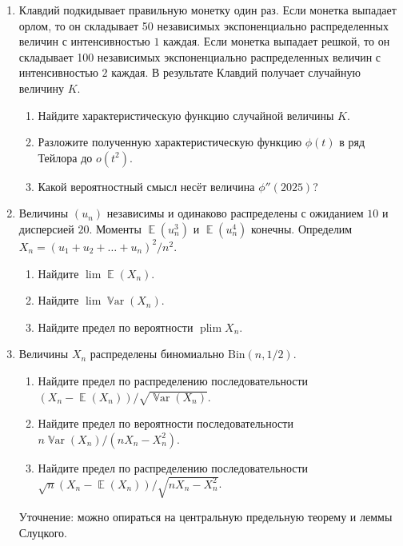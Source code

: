\documentclass[12pt]{article}
\DeclareMathOperator{\Var}{\mathbb{V}ar}
\DeclareMathOperator{\plim}{plim}
\DeclareMathOperator{\E}{\mathbb{E}}
\newcommand{\dBin}{\mathrm{Bin}}
\begin{document}
\begin{enumerate}
    \item Клавдий подкидывает правильную монетку один раз. 
    Если монетка выпадает орлом, то он складывает 50 независимых экспоненциально распределенных величин с интенсивностью $1$ каждая. 
    Если монетка выпадает решкой, то он складывает 100 независимых экспоненциально распределенных величин с интенсивностью $2$ каждая. 
    В результате Клавдий получает случайную величину $K$.

    \begin{enumerate}
        \item Найдите характеристическую функцию случайной величины $K$.
        \item Разложите полученную характеристическую функцию $\phi(t)$ в ряд Тейлора до $o(t^2)$.
        \item Какой вероятностный смысл несёт величина $\phi''(2025)$?
    \end{enumerate}

    \item Величины $(u_n)$ независимы и одинаково распределены с ожиданием $10$ и дисперсией $20$.
    Моменты $\E(u_n^3)$ и $\E(u_n^4)$ конечны.
    Определим $X_n = (u_1 + u_2 + \dots + u_n)^2 / n^2$.

    \begin{enumerate}
        \item Найдите $\lim \E(X_n)$.
        \item Найдите $\lim \Var(X_n)$.
        \item Найдите предел по вероятности $\plim X_n$.
    \end{enumerate}
    
    \item Величины $X_n$ распределены биномиально $\dBin(n, 1/2)$.
    \begin{enumerate}
        \item Найдите предел по распределению последовательности $(X_n - \E(X_n)) / \sqrt{\Var(X_n)}$.
        \item Найдите предел по вероятности последовательности $n\Var(X_n) / (nX_n  - X^2_n)$.
        \item Найдите предел по распределению последовательности $\sqrt{n} (X_n - \E(X_n)) / \sqrt{nX_n  - X^2_n}$.
    \end{enumerate}

    Уточнение: можно опираться на центральную предельную теорему и леммы Слуцкого. 

\end{enumerate}
\end{document}
